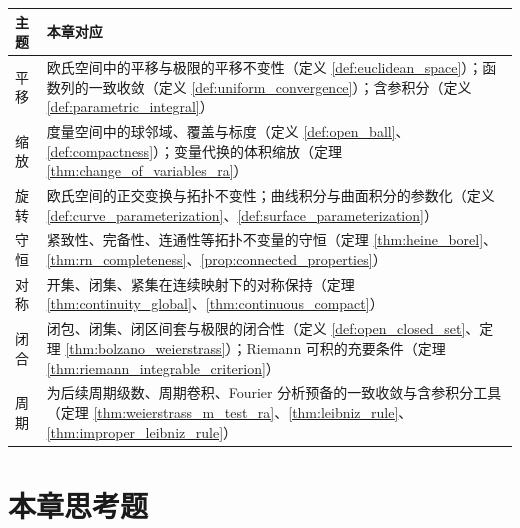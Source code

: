 \begin{center}
\renewcommand{\arraystretch}{1.3}
\begin{tabular}{>{\centering\arraybackslash}p{2.2cm}>{\centering\arraybackslash}p{10.5cm}}
\toprule
主题 & 本章对应 \\
\midrule
平移 & 欧氏空间中的平移与极限的平移不变性（定义 \ref{def:euclidean_space}）；函数列的一致收敛（定义 \ref{def:uniform_convergence}）；含参积分（定义 \ref{def:parametric_integral}） \\
缩放 & 度量空间中的球邻域、覆盖与标度（定义 \ref{def:open_ball}、\ref{def:compactness}）；变量代换的体积缩放（定理 \ref{thm:change_of_variables_ra}） \\
旋转 & 欧氏空间的正交变换与拓扑不变性；曲线积分与曲面积分的参数化（定义 \ref{def:curve_parameterization}、\ref{def:surface_parameterization}） \\
守恒 & 紧致性、完备性、连通性等拓扑不变量的守恒（定理 \ref{thm:heine_borel}、\ref{thm:rn_completeness}、\ref{prop:connected_properties}） \\
对称 & 开集、闭集、紧集在连续映射下的对称保持（定理 \ref{thm:continuity_global}、\ref{thm:continuous_compact}） \\
闭合 & 闭包、闭集、闭区间套与极限的闭合性（定义 \ref{def:open_closed_set}、定理 \ref{thm:bolzano_weierstrass}）；Riemann 可积的充要条件（定理 \ref{thm:riemann_integrable_criterion}） \\
周期 & 为后续周期级数、周期卷积、Fourier 分析预备的一致收敛与含参积分工具（定理 \ref{thm:weierstrass_m_test_ra}、\ref{thm:leibniz_rule}、\ref{thm:improper_leibniz_rule}） \\
\bottomrule
\end{tabular}
\end{center}

\clearpage

\section*{本章思考题}

